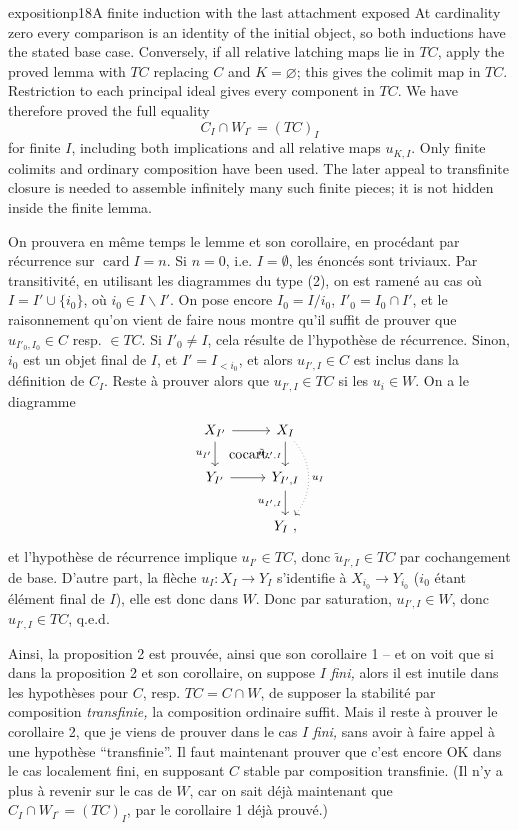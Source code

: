\begin{dcomment}{exposition}{p18}{A finite induction with the last attachment exposed}
At cardinality zero every comparison is an identity of the initial object, so both inductions have the stated base case. Conversely, if all relative latching maps lie in $TC$, apply the proved lemma with $TC$ replacing $C$ and $K=\varnothing$; this gives the colimit map in $TC$. Restriction to each principal ideal gives every component in $TC$. We have therefore proved the full equality
\[
 C_I\cap W_{I^\circ}=(TC)_I
\]
for finite $I$, including both implications and all relative maps $u_{K,I}$. Only finite colimits and ordinary composition have been used. The later appeal to transfinite closure is needed to assemble infinitely many such finite pieces; it is not hidden inside the finite lemma.
\end{dcomment}


On prouvera en même temps le lemme et son corollaire, en procédant par récurrence sur $\operatorname{card} I = n$. Si $n = 0$, i.e. $I = \emptyset$, les énoncés sont triviaux. Par transitivité, en utilisant les diagrammes du type (2), on est ramené au cas où $I = I' \cup \{i_0\}$, où $i_0 \in I \backslash I'$. On pose encore $I_0 = I/i_0$, $I'_0 = I_0 \cap I'$, et le raisonnement qu'on vient de faire nous montre qu'il suffit de prouver que $u_{I'_0,I_0} \in C$ resp. $\in TC$. Si $I'_0 \neq I$, cela résulte de l'hypothèse de récurrence. %
Sinon, $i_0$ est un objet final de $I$, et $I' = I_{<i_0}$, et alors $u_{I',I} \in C$ est inclus dans la définition de $C_I$. Reste à prouver alors que $u_{I',I} \in TC$ si les $u_i \in W$. On a le diagramme
\[
\begin{tikzcd}
X_{I'} \arrow[r] \arrow[d, "u_{I'}"'] \arrow[dr, phantom, "\cocart"] & X_I \arrow[d, "\tilde{u}_{I',I}"'] \arrow[dd, dotted, bend left=40, "u_I"] \\
Y_{I'} \arrow[r] & Y_{I',I} \arrow[d, "u_{I',I}"'] \\
 & Y_I\ ,
\end{tikzcd}
\]
 et l'hypothèse de récurrence implique $u_{I'} \in TC$, donc $\tilde{u}_{I',I} \in TC$ par cochangement de base. D'autre part, la flèche $u_I : X_I \longrightarrow Y_I$ s'identifie à $X_{i_0} \longrightarrow Y_{i_0}$ ($i_0$ étant élément final de $I$), elle est donc dans $W$. Donc par saturation, $u_{I',I} \in W$, donc $u_{I',I} \in TC$, q.e.d.

Ainsi, la proposition 2 est prouvée, ainsi que son corollaire 1 -- et on voit que si dans la proposition 2 et son corollaire, on suppose $I$ \textit{fini,} alors il est inutile dans les hypothèses pour $C$, resp. $TC = C \cap W$, de supposer la stabilité par composition \textit{transfinie,} la composition ordinaire suffit. Mais il reste à prouver le corollaire 2, que je viens de prouver dans le cas $I$ \textit{fini,} sans avoir à faire appel à une hypothèse ``transfinie''. Il faut maintenant prouver que c'est encore OK dans le cas localement fini, en supposant $C$ stable par composition transfinie. (Il n'y a plus à revenir sur le cas de $W$, car on sait déjà maintenant que $C_I \cap W_{I^\circ} = (TC)_I$, par le corollaire 1 déjà prouvé.)

